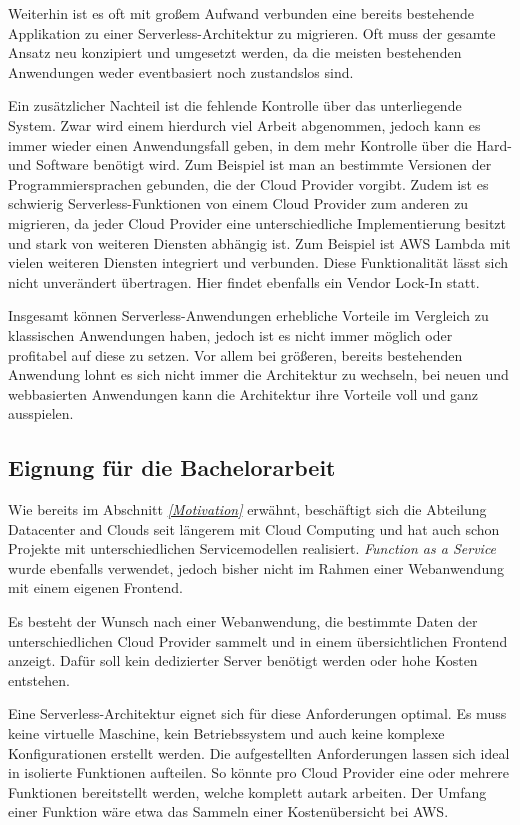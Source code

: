 Weiterhin ist es oft mit großem Aufwand verbunden eine bereits bestehende Applikation zu einer Serverless-Architektur zu migrieren.
Oft muss der gesamte Ansatz neu konzipiert und umgesetzt werden, da die meisten bestehenden Anwendungen weder eventbasiert noch zustandslos sind.

Ein zusätzlicher Nachteil ist die fehlende Kontrolle über das unterliegende System.
Zwar wird einem hierdurch viel Arbeit abgenommen, jedoch kann es immer wieder einen Anwendungsfall geben, in dem mehr Kontrolle über die Hard- und Software benötigt wird.
Zum Beispiel ist man an bestimmte Versionen der Programmiersprachen gebunden, die der Cloud Provider vorgibt.
Zudem ist es schwierig Serverless-Funktionen von einem Cloud Provider zum anderen zu migrieren, da jeder Cloud Provider eine unterschiedliche Implementierung besitzt und stark von weiteren Diensten abhängig ist.
Zum Beispiel ist AWS Lambda mit vielen weiteren Diensten integriert und verbunden.
Diese Funktionalität lässt sich nicht unverändert übertragen.
Hier findet ebenfalls ein Vendor Lock-In statt.


Insgesamt können Serverless-Anwendungen erhebliche Vorteile im Vergleich zu klassischen Anwendungen haben, jedoch ist es nicht immer möglich oder profitabel auf diese zu setzen.
Vor allem bei größeren, bereits bestehenden Anwendung lohnt es sich nicht immer die Architektur zu wechseln, bei neuen und webbasierten Anwendungen kann die Architektur ihre Vorteile voll und ganz ausspielen.
\clearpage
\subsection{Eignung für die Bachelorarbeit}
Wie bereits im Abschnitt \textit{\ref{Motivation} } erwähnt, beschäftigt sich die Abteilung Datacenter and Clouds seit längerem mit Cloud Computing und hat auch schon Projekte mit unterschiedlichen Servicemodellen realisiert.
\textsl{Function as a Service} wurde ebenfalls verwendet, jedoch bisher nicht im Rahmen einer Webanwendung mit einem eigenen Frontend.

Es besteht der Wunsch nach einer Webanwendung, die bestimmte Daten der unterschiedlichen Cloud Provider sammelt und in einem übersichtlichen Frontend anzeigt.
Dafür soll kein dedizierter Server benötigt werden oder hohe Kosten entstehen.

Eine Serverless-Architektur eignet sich für diese Anforderungen optimal.
Es muss keine virtuelle Maschine, kein Betriebssystem und auch keine komplexe Konfigurationen erstellt werden.
Die aufgestellten Anforderungen lassen sich ideal in isolierte Funktionen aufteilen.
So könnte pro Cloud Provider eine oder mehrere Funktionen bereitstellt werden, welche komplett autark arbeiten.
Der Umfang einer Funktion wäre etwa das Sammeln einer Kostenübersicht bei AWS.

